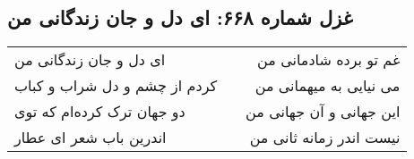 \begin{center}
\section*{غزل شماره ۶۶۸: ای دل و جان زندگانی من}
\label{sec:668}
\begin{longtable}{l p{0.5cm} r}
ای دل و جان زندگانی من
&&
غم تو برده شادمانی من
\\
کردم از چشم و دل شراب و کباب
&&
می نیایی به میهمانی من
\\
دو جهان ترک کرده‌ام که توی
&&
این جهانی و آن جهانی من
\\
اندرین باب شعر ای عطار
&&
نیست اندر زمانه ثانی من
\\
\end{longtable}
\end{center}
